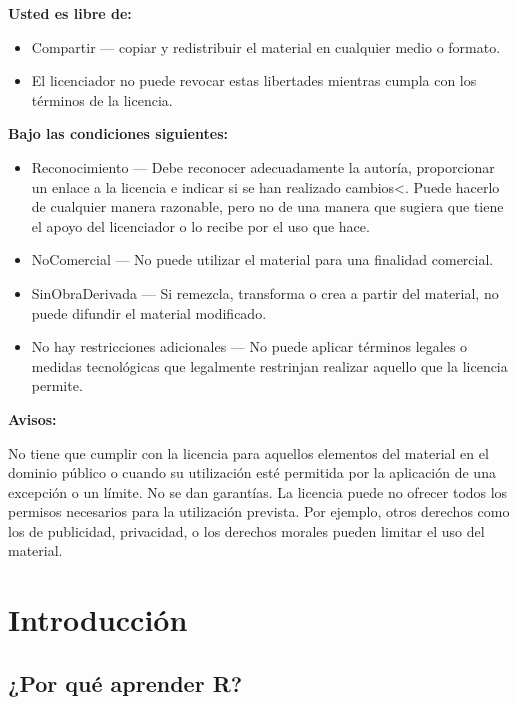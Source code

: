 \documentclass[]{book}
\providecommand{\tightlist}{%
  \setlength{\itemsep}{0pt}\setlength{\parskip}{0pt}}
\begin{document}
\textbf{Usted es libre de:}

\begin{itemize}
\tightlist
\item
  Compartir --- copiar y redistribuir el material en cualquier medio o
  formato.
\item
  El licenciador no puede revocar estas libertades mientras cumpla con
  los términos de la licencia.
\end{itemize}

\textbf{Bajo las condiciones siguientes:}

\begin{itemize}
\item
  Reconocimiento --- Debe reconocer adecuadamente la autoría,
  proporcionar un enlace a la licencia e indicar si se han realizado
  cambios\textless{}. Puede hacerlo de cualquier manera razonable, pero
  no de una manera que sugiera que tiene el apoyo del licenciador o lo
  recibe por el uso que hace.
\item
  NoComercial --- No puede utilizar el material para una finalidad
  comercial.
\item
  SinObraDerivada --- Si remezcla, transforma o crea a partir del
  material, no puede difundir el material modificado.
\item
  No hay restricciones adicionales --- No puede aplicar términos legales
  o medidas tecnológicas que legalmente restrinjan realizar aquello que
  la licencia permite.
\end{itemize}

\textbf{Avisos: }

No tiene que cumplir con la licencia para aquellos elementos del
material en el dominio público o cuando su utilización esté permitida
por la aplicación de una excepción o un límite. No se dan garantías. La
licencia puede no ofrecer todos los permisos necesarios para la
utilización prevista. Por ejemplo, otros derechos como los de
publicidad, privacidad, o los derechos morales pueden limitar el uso del
material.

\chapter{Introducción}\label{intro}

\section{¿Por qué aprender R?}\label{por-que-aprender-r}
\end{document}
